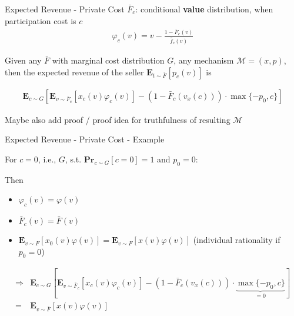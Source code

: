 \documentclass{beamer}
\begin{document}
\begin{frame}{Expected Revenue - Private Cost}
  $\bar{F}_c$: conditional \textbf{value} distribution, when participation cost is $c$
  \begin{align*}
    \varphi_c(v) = v - \frac{1- \bar{F}_c(v)}{\hat{f}_c(v)}
  \end{align*}

  \begin{theorem}
    Given any $\bar{F}$ with marginal cost distribution $G$, any mechanism $\mathcal{M}=(x,p)$, then the expected revenue of the seller $\mathbf{E}_{t \sim \bar{F}}\left[p_c(v)\right] $ is

    \begin{align*}
      \mathbf{E}_{c \sim G}\left[\mathbf{E}_{v\sim\bar{F}_c}\left[x_c(v)\varphi_c(v)\right] - (1-\bar{F}_c(v_x(c))) \cdot \max\{-p_0,c\}\right]
    \end{align*}
  \end{theorem}

  Maybe also add proof / proof idea for truthfulness of resulting $\mathcal{M}$
\end{frame}

\begin{frame}{Expected Revenue - Private Cost - Example}
  \begin{example}
    For $c = 0$, i.e., $G$, s.t. $\mathbf{Pr}_{c \sim G}[c = 0] = 1$ and $p_0 = 0$:
  \end{example}

  Then 
  \begin{itemize}
    \item $\varphi_c(v) = \varphi(v)$
    \item $\bar{F}_c(v) = \bar{F}(v)$
    \item $\mathbf{E}_{v \sim F}\left[x_0(v) \varphi(v)\right] = \mathbf{E}_{v \sim F}\left[x(v) \varphi(v)\right]$  
    (individual rationality if $p_0 = 0$)
  \end{itemize}

  \begin{align*}
    \Rightarrow&\mathbf{E}_{c \sim G}\left[\mathbf{E}_{v\sim\bar{F}_c}\left[x_c(v)\varphi_c(v)\right] - (1-\bar{F}_c(v_x(c))) \cdot \underbrace{\max\{-p_0,c\}}_{=0}\right] \\
    =&\mathbf{E}_{v \sim \bar{F}}\left[x(v) \varphi(v)\right]
  \end{align*}
\end{frame}
\end{document}
